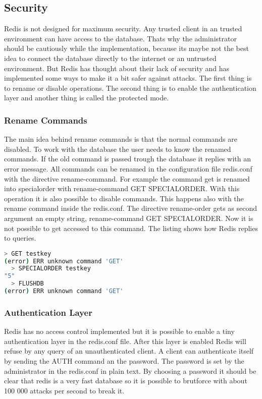 
\subsection{Security}
Redis is not designed for maximum security. Any trusted client in an trusted environment can have access to the database. That\grq s why the administrator should be cautiously while the implementation, because it\grq s maybe not the best idea to connect the database directly to the internet or an untrusted environment. But Redis has thought about their lack of security and has implemented some ways to make it a bit safer against attacks. The first thing is to rename or disable operations. The second thing is to enable the authentication layer and another thing is called the protected mode.

\subsubsection{Rename Commands}
The main idea behind rename commands is that the normal commands are disabled. To work with the database the user needs to know the renamed commands. If the old command is passed trough the database it replies with an error message.  All commands can be renamed in the configuration file redis.conf with the directive rename-command. For example the command get is renamed into \glqq specialorder \grqq with rename-command GET SPECIALORDER. With this operation it is also possible to disable commands. This happens also with the rename command inside the redis.conf. The directive rename-order gets as second argument an empty string, rename-command GET SPECIALORDER. Now it is not possible to get accessed to this command. The listing shows how Redis replies to queries. \cite{RedisSicherheit}
\begin{lstlisting}[language=bash]
  > GET testkey
(error) ERR unknown command 'GET'
  > SPECIALORDER testkey
"5"
  > FLUSHDB
(error) ERR unknown command 'GET'
\end{lstlisting}

\subsubsection{Authentication Layer}
Redis has no access control implemented but it is possible to enable a tiny authentication layer in the redis.conf file. After this layer is enabled Redis will refuse by any query of an unauthenticated client. A client can authenticate itself by sending the AUTH command an the password. The password is set by the administrator in the redis.conf in plain text.\cite{RedisSecurity} By choosing a password it should be clear that redis is a very fast database so it is possible to brutforce with about 100 000 attacks per second to break it. \cite{RedisSicherheit}

